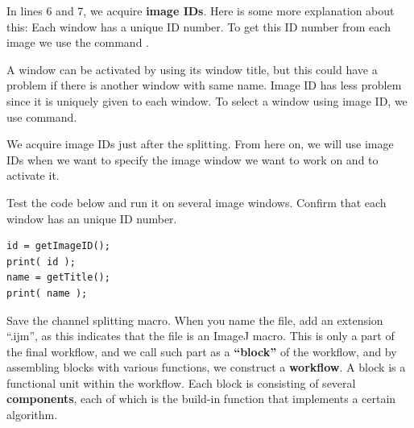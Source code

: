 In lines 6 and 7, we acquire \textbf{image IDs}. Here is some more explanation about this: Each window has a unique ID number. To get this ID number from each image we use the command .

\begin{indentCom}
\end{indentCom}

A window can be activated by  using its window title, but this could have a problem if there is another window with same name. Image ID has less problem since it is uniquely given to each window. To select a window using image ID, we use  command.

\begin{indentCom}
\end{indentCom}

We acquire image IDs just after the splitting. From here on, we will use image IDs when we want to specify the image window we want to work on and to activate it. 

\begin{indentexercise}{1}
Test the code below and run it on several image windows. Confirm that each window has an unique ID number. 
\begin{lstlisting}
id = getImageID();
print( id );
name = getTitle();
print( name );
\end{lstlisting}
\end{indentexercise}

Save the channel splitting macro. When you name the file, add an extension ``.ijm'', as this indicates that the file is an ImageJ macro. This is only a part of the final workflow, and we call such part as a \textbf{``block''} of the workflow, and by assembling blocks with various functions, we construct a \textbf{workflow}. A block is a functional unit within the workflow. Each block is consisting of several \textbf{components}, each of which is the build-in function that implements a certain algorithm.  

